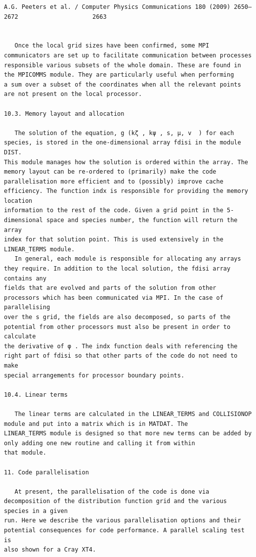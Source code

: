 \documentclass[a4paper]{article}
\newcommand{\gkwpagefont}{\fontsize{6.0pt}{7.55pt}\selectfont}
\begin{document}
\newpage
\begin{Verbatim}[fontsize=\gkwpagefont]
                                             A.G. Peeters et al. / Computer Physics Communications 180 (2009) 2650–2672                     2663


   Once the local grid sizes have been confirmed, some MPI communicators are set up to facilitate communication between processes
responsible various subsets of the whole domain. These are found in the MPICOMMS module. They are particularly useful when performing
a sum over a subset of the coordinates when all the relevant points are not present on the local processor.

10.3. Memory layout and allocation

   The solution of the equation, g (kζ , kψ , s, μ, v  ) for each species, is stored in the one-dimensional array fdisi in the module DIST.
This module manages how the solution is ordered within the array. The memory layout can be re-ordered to (primarily) make the code
parallelisation more efficient and to (possibly) improve cache efficiency. The function indx is responsible for providing the memory location
information to the rest of the code. Given a grid point in the 5-dimensional space and species number, the function will return the array
index for that solution point. This is used extensively in the LINEAR_TERMS module.
   In general, each module is responsible for allocating any arrays they require. In addition to the local solution, the fdisi array contains any
fields that are evolved and parts of the solution from other processors which has been communicated via MPI. In the case of parallelising
over the s grid, the fields are also decomposed, so parts of the potential from other processors must also be present in order to calculate
the derivative of φ . The indx function deals with referencing the right part of fdisi so that other parts of the code do not need to make
special arrangements for processor boundary points.

10.4. Linear terms

   The linear terms are calculated in the LINEAR_TERMS and COLLISIONOP module and put into a matrix which is in MATDAT. The
LINEAR_TERMS module is designed so that more new terms can be added by only adding one new routine and calling it from within
that module.

11. Code parallelisation

   At present, the parallelisation of the code is done via decomposition of the distribution function grid and the various species in a given
run. Here we describe the various parallelisation options and their potential consequences for code performance. A parallel scaling test is
also shown for a Cray XT4.


\end{Verbatim}
\end{document}
